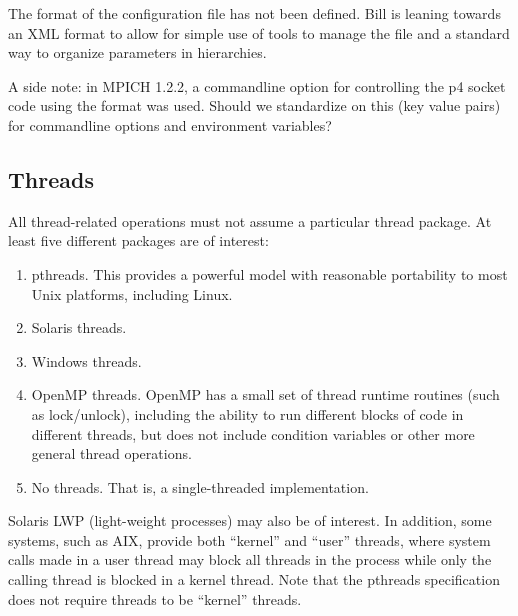 \documentclass{article}
\begin{document}



The format of the configuration file has not been defined.  Bill is leaning
towards an XML format to allow for simple use of tools to manage the file and
a standard way to organize parameters in hierarchies.

A side note: in MPICH 1.2.2, a commandline option for controlling the
p4 socket code using the format 
was used.  Should we standardize on this (key \code{=} value pairs)
for commandline options and environment variables?

\subsection{Threads}
\label{sec:threads}
All thread-related operations must not assume a particular thread
package.  At least five different packages are of interest:
\begin{enumerate}
\item pthreads.  This provides a powerful model with reasonable
portability to most Unix platforms, including Linux.  

\item Solaris threads.

\item Windows threads.  

\item OpenMP threads.  OpenMP has a small set of thread runtime
routines (such as lock/unlock), including the ability to run different blocks
of code in different threads, but does not include condition variables
or other more general thread operations.

\item No threads.  That is, a single-threaded implementation.  
\end{enumerate}
Solaris LWP (light-weight processes) may also be of interest.  In
addition, some systems, such as AIX, provide both ``kernel'' and
``user'' threads, where system calls made in a user thread may block
all threads in the process while only the calling thread is blocked in
a kernel thread.  Note that the pthreads specification does not
require threads to be ``kernel'' threads. 
\end{document}
